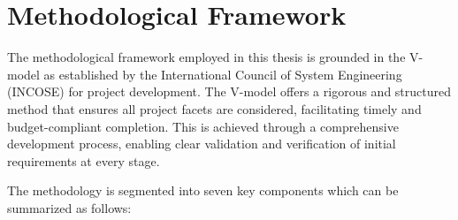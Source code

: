 \chapter{Methodological Framework}

The methodological framework employed in this thesis is grounded in the V-model as established by the International Council of System Engineering (INCOSE) \autocite{INCOSE2015} for project development. The V-model offers a rigorous and structured method that ensures all project facets are considered, facilitating timely and budget-compliant completion. This is achieved through a comprehensive development process, enabling clear validation and verification of initial requirements at every stage.

The methodology is segmented into seven key components which can be summarized as follows:

